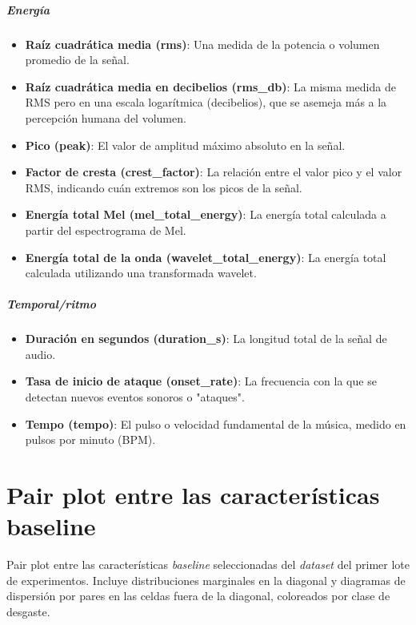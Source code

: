 \documentclass[12pt, letterpaper]{report}
\begin{document}
\paragraph{Energía}

\begin{itemize}[leftmargin=1.77cm]
\item \textbf{Raíz cuadrática media (rms)}: Una medida de la potencia o volumen promedio de la señal.
\item \textbf{Raíz cuadrática media en decibelios (rms\_db)}: La misma medida de RMS pero en una escala logarítmica (decibelios), que se asemeja más a la percepción humana del volumen.
\item \textbf{Pico (peak)}: El valor de amplitud máximo absoluto en la señal.
\item \textbf{Factor de cresta (crest\_factor)}: La relación entre el valor pico y el valor RMS, indicando cuán extremos son los picos de la señal.
\item \textbf{Energía total Mel (mel\_total\_energy)}: La energía total calculada a partir del espectrograma de Mel.
\item \textbf{Energía total de la onda (wavelet\_total\_energy)}: La energía total calculada utilizando una transformada wavelet.
\end{itemize}
\paragraph{Temporal/ritmo}

\begin{itemize}[leftmargin=1.77cm]
\item \textbf{Duración en segundos (duration\_s)}: La longitud total de la señal de audio.
\item \textbf{Tasa de inicio de ataque (onset\_rate)}: La frecuencia con la que se detectan nuevos eventos sonoros o "ataques".
\item \textbf{Tempo (tempo)}: El pulso o velocidad fundamental de la música, medido en pulsos por minuto (BPM).
\end{itemize}

\chapter{Pair plot entre las características baseline}
\label{ap:pairplot}

Pair plot entre las características \emph{baseline} seleccionadas del \textit{dataset} del primer lote de experimentos. Incluye distribuciones marginales en la diagonal y diagramas de dispersión por pares en las celdas fuera de la diagonal, coloreados por clase de desgaste.
\end{document}
